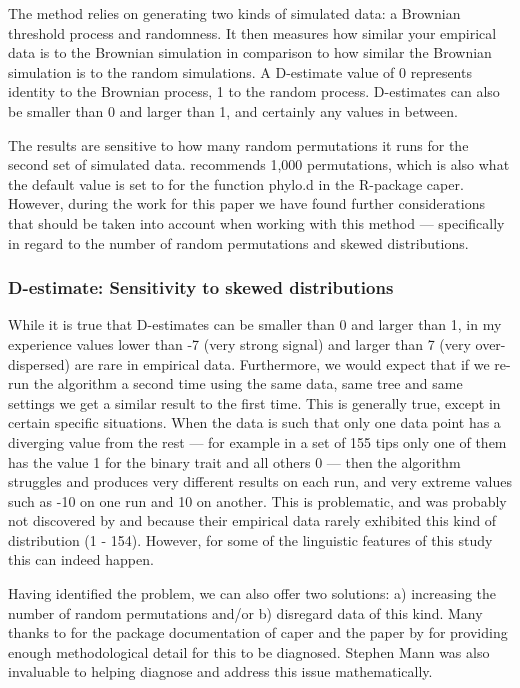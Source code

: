 \documentclass[12pt,letterpaper]{article}
\begin{document}
The method relies on generating two kinds of simulated data: a Brownian threshold process and randomness. It then measures how similar your empirical data is to the Brownian simulation in comparison to how similar the Brownian simulation is to the random simulations. A D-estimate value of 0 represents identity to the Brownian process, 1 to the random process. D-estimates can also be smaller than 0 and larger than 1, and certainly any values in between. 

The results are sensitive to how many random permutations it runs for the second set of simulated data. \cite{fritz2010selectivity} recommends 1,000 permutations, which is also what the default value is set to for the function phylo.d in the R-package caper. However, during the work for this paper we have found further considerations that should be taken into account when working with this method --- specifically in regard to the number of random permutations and skewed distributions.

\subsubsection{D-estimate: Sensitivity to skewed distributions}
\label{sec:SM_phylo_d_sensitive}
While it is true that D-estimates can be smaller than 0 and larger than 1, in my experience values lower than -7 (very strong signal) and larger than 7 (very over-dispersed) are rare in empirical data. Furthermore, we would expect that if we re-run the algorithm a second time using the same data, same tree and same settings we get a similar result to the first time. This is generally true, except in certain specific situations. When the data is such that only one data point has a diverging value from the rest --- for example in a set of 155 tips only one of them has the value 1 for the binary trait and all others 0 --- then the algorithm struggles and produces very different results on each run, and very extreme values such as -10 on one run and 10 on another. This is problematic, and was probably not discovered by \cite{fritz2010selectivity} and \cite{orme2013caper} because their empirical data rarely exhibited this kind of distribution (1 - 154). However, for some of the linguistic features of this study this can indeed happen. 

Having identified the problem, we can also offer two solutions: a) increasing the number of random permutations and/or b) disregard data of this kind. Many thanks to \citep{orme2013caper} for the package documentation of caper and the paper by \cite{fritz2010selectivity} for providing enough methodological detail for this to be diagnosed. Stephen Mann was also invaluable to helping diagnose and address this issue mathematically.
\end{document}
